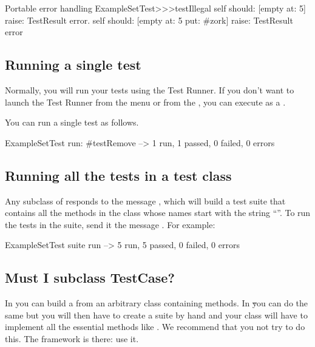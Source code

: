 \documentclass[a4paper,10pt,twoside]{book}
\begin{document}
\begin{method}[portabletestillegal]{Portable error handling}
ExampleSetTest>>>testIllegal
	self should: [empty at: 5] raise: TestResult error.
	self should: [empty at: 5 put: #zork] raise: TestResult error
\end{method}


\subsection{Running a single test}
Normally, you will run your tests using the Test Runner.
If you don't want to launch the Test Runner from the  menu or from the \toolsflap, you can execute
 as a .

You can run a single test as follows.

\begin{code}{}
ExampleSetTest run: #testRemove --> 1 run, 1 passed, 0 failed, 0 errors
\end{code}

\subsection{Running all the tests in a test class}

Any subclass of  responds to the message , which will build a test suite that contains all the
methods in the class whose names start with the string ``''.
To run the tests in the suite, send it the message .
For example:

\begin{code}{}
ExampleSetTest suite run --> 5 run, 5 passed, 0 failed, 0 errors
\end{code}

\subsection{Must I subclass TestCase?}

In \JUnit{} you can build a  from an arbitrary class
containing  methods.  In \st you can do the same
but you will then have to create a suite by hand and your class will
have to implement all the essential  methods like .
We recommend that you not try to do this.  The framework is there: use it.
\end{document}

